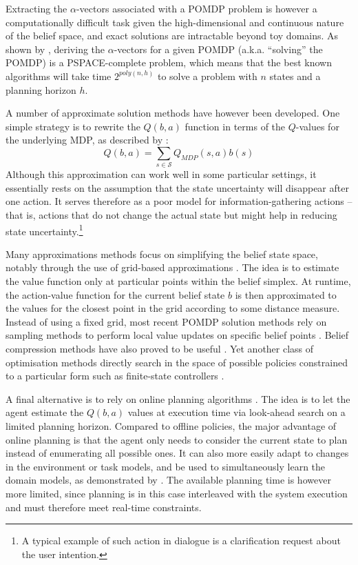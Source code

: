 Extracting the $\alpha$-vectors associated with a POMDP problem is however a computationally difficult task given the high-dimensional and continuous nature of the belief space, and exact solutions are intractable beyond toy domains. As shown by \cite{Papadimitriou:1987}, deriving the $\alpha$-vectors for a given POMDP (a.k.a. ``solving'' the POMDP) is a PSPACE-complete problem, which means that the best known algorithms will take time $2^{poly(n,h)}$ to solve a problem with $n$ states and a planning horizon $h$.

A number of approximate solution methods have however been developed.  One simple strategy is to rewrite the $Q(b,a)$ function in terms of the $Q$-values for the underlying MDP, as described by \cite{Littman:1997}:
\begin{equation}
Q(b,a) = \sum_{s \in \mathcal{S}} Q_{MDP} (s,a) b(s)
\end{equation}
Although this approximation can work well in some particular settings, it essentially rests on the assumption that the state uncertainty will disappear after one action.  It serves therefore as a poor model for information-gathering actions -- that is, actions that do not change the actual state but might help in reducing state uncertainty.\footnote{A typical example of such action in dialogue is a clarification request about the user intention.} 

Many approximations methods focus on simplifying the belief state space, notably through the use of grid-based approximations \citep{Zhou:2001}.  The idea is to estimate the value function only at particular points within the belief simplex. At runtime, the action-value function for the current belief state $b$ is then approximated to the values for the closest point in the grid according to some distance measure. Instead of using a fixed grid, most recent POMDP solution methods rely on sampling methods to perform local value updates on specific belief points \citep{Pineau_2003,KurHsu08}. Belief compression methods have also proved to be useful \citep{Roy:2005}.  Yet another class of optimisation methods directly search in the space of possible policies constrained to a particular form such as finite-state controllers \citep{Hansen98}. 

A final alternative is to rely on online planning algorithms \citep{ross2008,NIPS2010_0740}.  The idea is to let the agent estimate the $Q(b,a)$ values at execution time via look-ahead search on a limited planning horizon. Compared to offline policies, the major advantage of online planning is that the agent only needs to consider the current state to plan instead of enumerating all possible ones. It can also more easily adapt to changes in the environment or task models, and be used to simultaneously learn the domain models, as demonstrated by \cite{Ross:2011}.  The available planning time is however more limited, since planning is in this case interleaved with the system execution and must therefore meet real-time constraints.

